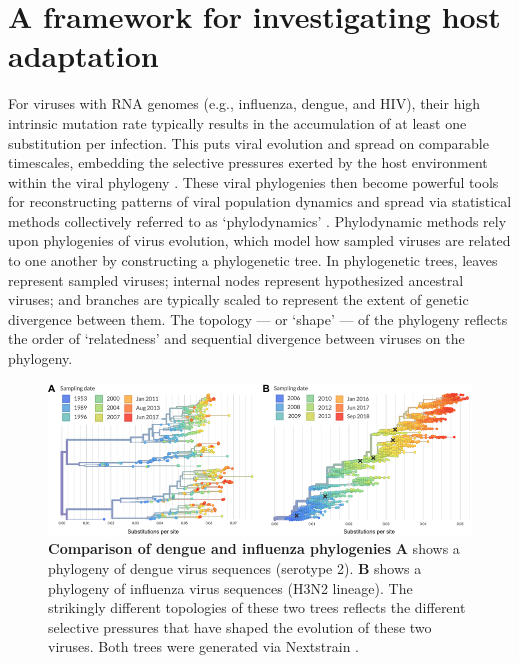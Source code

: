 \section{A framework for investigating host adaptation}
For viruses with RNA genomes (e.g., influenza, dengue, and HIV), their high intrinsic mutation rate typically results in the accumulation of at least one  substitution per infection.
This puts viral evolution and spread on comparable timescales, embedding the selective pressures exerted by the host environment within the viral phylogeny \citep{bedford2011strength}.
These viral phylogenies then become powerful tools for reconstructing patterns of viral population dynamics and spread via statistical methods collectively referred to as `phylodynamics' \citep{grenfell2004unifying}.
Phylodynamic methods rely upon phylogenies of virus evolution, which model how sampled viruses are related to one another by constructing a phylogenetic tree.
In phylogenetic trees, leaves represent sampled viruses; internal nodes represent hypothesized ancestral viruses; and branches are typically scaled to represent the extent of genetic divergence between them.
The topology --- or `shape' --- of the phylogeny reflects the order of `relatedness' and sequential divergence between viruses on the phylogeny.

\begin{figure}[h!]
  \begin{centering}
    \includegraphics[width=\linewidth]{./png/dengue_vs_influenza.png}
  	\caption[Comparison of dengue and influenza phylogenies]{\textbf{Comparison of dengue and influenza phylogenies }
\textbf{A} shows a phylogeny of dengue virus sequences (serotype 2).
\textbf{B} shows a phylogeny of influenza virus sequences (H3N2 lineage).
The strikingly different topologies of these two trees reflects the different selective pressures that have shaped the evolution of these two viruses.
Both trees were generated via Nextstrain \citep{hadfield2017nextstrain}.
}
  	\label{dengue_vs_influenza}
  \end{centering}
\end{figure}

